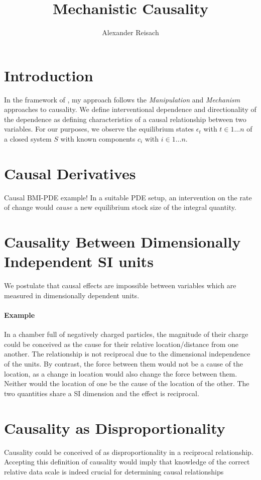\documentclass{article}
\title{Mechanistic Causality}
\author{Alexander Reisach}
\begin{document}
\maketitle
    
\section{Introduction}
In the framework of \cite{brady2008causation}, my approach follows the \emph{Manipulation} and \emph{Mechanism} approaches to causality. 
We define interventional dependence and directionality of the dependence as defining characteristics of a causal relationship between two variables.
For our purposes, we observe the equilibrium states $\epsilon_t$ with $t \in 1 \dots n$ of a closed system $S$ with known components $c_i$ with $i \in 1 \dots n$. 

\section{Causal Derivatives}
Causal BMI-PDE example!
In a suitable PDE setup, an intervention on the rate of change would \emph{cause} a new equilibrium stock size of the integral quantity.

\section{Causality Between Dimensionally Independent SI units}
We postulate that causal effects are impossible between variables which are measured in dimensionally dependent units.

\paragraph{Example} In a chamber full of negatively charged particles, the magnitude of their charge could be conceived as the cause for their relative location/distance from one another. The relationship is not reciprocal due to the dimensional independence of the units. By contrast, the force between them would not be a cause of the location, as a change in location would also change the force between them. Neither would the location of one be the cause of the location of the other. The two quantities share a SI dimension and the effect is reciprocal.

\section{Causality as Disproportionality}
Causality could be conceived of as disproportionality in a reciprocal relationship. Accepting this definition of causality would imply that knowledge of the correct relative data scale is indeed crucial for determining causal relationships
\end{document}
